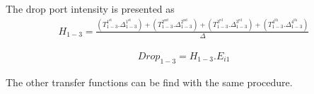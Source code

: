 \documentclass{osa-article}
\begin{document}
The drop port intensity is presented as
\begin{equation}
\begin{split}
H_{1-3}=\frac{(T^{1^{\text{st}}}_{1-3}.\Delta^{1^{\text{st}}}_{1-3})+(T^{2^{\text{nd}}}_{1-3}.\Delta^{2^{\text{nd}}}_{1-3})+(T^{3^{\text{rd}}}_{1-3}.\Delta^{3^{\text{rd}}}_{1-3})+(T^{4^{\text{th}}}_{1-3}.\Delta^{4^{\text{th}}}_{1-3})}{\Delta}
\end{split}
\end{equation}

\begin{equation}
\begin{split}
Drop_{1-3}=H_{1-3}.E_{i1}
\end{split}
\end{equation}

The other transfer functions can be find with the same procedure.\\



%


 
%
%
%
%
\end{document}
